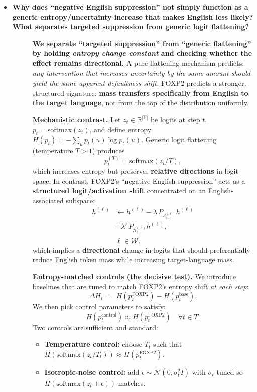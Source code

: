 \begin{itemize}[leftmargin=1.5em]
\item[\ding{93}] \textbf{Why does “negative English suppression” not simply function as a generic entropy/uncertainty increase that makes English less likely? What separates targeted suppression from generic logit flattening?}
\begin{description}
\item[] \textbf{We separate “targeted suppression” from “generic flattening” by holding \emph{entropy change constant} and checking whether the effect remains \textbf{directional}.}
A pure flattening mechanism predicts: \emph{any intervention that increases uncertainty by the same amount should yield the same apparent defaultness shift.} FOXP2 predicts a stronger, structured signature: \textbf{mass transfers specifically from English to the target language}, not from the top of the distribution uniformly.

\vspace{3pt}
\textbf{Mechanistic contrast.}
Let $z_t\in\mathbb{R}^{|\mathcal{V}|}$ be logits at step $t$, $p_t=\mathrm{softmax}(z_t)$, and define entropy $H(p_t)=-\sum_u p_t(u)\log p_t(u)$.
Generic logit flattening (temperature $T>1$) produces
\[
p_t^{(T)}=\mathrm{softmax}(z_t/T),
\]
which increases entropy but preserves \textbf{relative directions} in logit space. In contrast, FOXP2’s “negative English suppression” acts as a \textbf{structured logit/activation shift} concentrated on an English-associated subspace:
\[
\begin{aligned}
h^{(\ell)} &\leftarrow h^{(\ell)} - \lambda\,P_{\mathcal{S}_{\mathrm{en}}^{(\ell)}}h^{(\ell)}\\
&+ \lambda'\,P_{\mathcal{S}_{\ell_t}^{(\ell)}}h^{(\ell)},\\
&\ell\in\mathcal{W}.
\end{aligned}
\]
which implies a \textbf{directional} change in logits that should preferentially reduce English token mass while increasing target-language mass.

\vspace{4pt}
\textbf{Entropy-matched controls (the decisive test).}
We introduce baselines that are tuned to match FOXP2’s entropy shift \emph{at each step}:
\[
\Delta H_t \;=\; H(p_t^{\text{FOXP2}})-H(p_t^{\text{base}}).
\]
We then pick control parameters to satisfy:
\[
H(p_t^{\text{control}})\approx H(p_t^{\text{FOXP2}})\quad \forall t\in T.
\]
Two controls are sufficient and standard:
\begin{itemize}[leftmargin=*,itemsep=2pt]
\item \textbf{Temperature control:} choose $T_t$ such that $H(\mathrm{softmax}(z_t/T_t))\approx H(p_t^{\text{FOXP2}})$.
\item \textbf{Isotropic-noise control:} add $\epsilon\sim \mathcal{N}(0,\sigma_t^2 I)$ with $\sigma_t$ tuned so $H(\mathrm{softmax}(z_t+\epsilon))$ matches.
\end{itemize}


\end{description}
\end{itemize}
